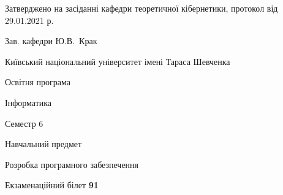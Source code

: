 \documentclass[10pt, ukrainian]{article}
\begin{document}
{\vspace{5mm}\smallskip \begin {small} Затверджено на засіданні кафедри теоретичної кібернетики, протокол  від   29.01.2021 р.\par\smallskip\smallskip
{\parbox {6.5 cm}{Зав. кафедри \dotfill Ю.В.~Крак}} \end{small}}
\newpage

{{\begin {small}\par
{ \center  Київський національний університет імені Тараса Шевченка \par}
{\parbox {5 cm}{Освітня програма \hfill}{\parbox {7 cm}{Інформатика \hfill}}\parbox {6 cm}{\hfill Семестр 6}}\par
{\parbox {5 cm} {Навчальний предмет \hfill}\parbox {7 cm}{Розробка програмного забезпечення \hfill}\parbox {6cm}{\hfill}\par}\vspace{-7pt} \end{small}}{\center Екзаменаційний білет \No \textbf
{ 91 }\par}}
\end{document}
